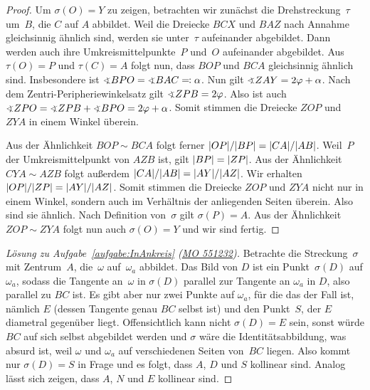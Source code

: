 \begin{proof}
	Um $\sigma(O)=Y$ zu zeigen, betrachten wir zunächst die Drehstreckung~$\tau$ um~$B$, die $C$ auf $A$ abbildet. Weil die Dreiecke $BCX$ und $BAZ$ nach Annahme gleichsinnig ähnlich sind, werden sie unter~$\tau$ aufeinander abgebildet. Dann werden auch ihre Umkreismittelpunkte~$P$ und~$O$ aufeinander abgebildet. Aus $\tau(O)=P$ und $\tau(C)=A$ folgt nun, dass $BOP$ und $BCA$ gleichsinnig ähnlich sind. Insbesondere ist $\winkel BPO=\winkel BAC\eqqcolon\alpha$. Nun gilt $\winkel ZAY=2\varphi+\alpha$. Nach dem Zentri-Peripheriewinkelsatz gilt $\winkel ZPB=2\varphi$. Also ist auch $\winkel ZPO=\winkel ZPB+\winkel BPO=2\varphi+\alpha$. Somit stimmen die Dreiecke $ZOP$ und $ZYA$ in einem Winkel überein.
	
	Aus der Ähnlichkeit $BOP\sim BCA$ folgt ferner $\abs*{OP}/\abs*{BP}=\abs*{CA}/\abs*{AB}$. Weil~$P$ der Umkreismittelpunkt von $AZB$ ist, gilt $\abs*{BP}=\abs*{ZP}$. Aus der Ähnlichkeit $CYA\sim AZB$ folgt außerdem $\abs*{CA}/\abs{AB}=\abs*{AY}/\abs*{AZ}$. Wir erhalten $\abs{OP}/\abs{ZP}=\abs{AY}/\abs{AZ}$. Somit stimmen die Dreiecke $ZOP$ und $ZYA$ nicht nur in einem Winkel, sondern auch im Verhältnis der anliegenden Seiten überein. Also sind sie ähnlich. Nach Definition von~$\sigma$ gilt $\sigma(P)=A$. Aus der Ähnlichkeit $ZOP\sim ZYA$ folgt nun auch $\sigma(O)=Y$ und wir sind fertig.
\end{proof}
\begin{proof}[Lösung zu Aufgabe~\ref{aufgabe:InAnkreis} \textmd{(\href{https://www.mathematik-olympiaden.de/moev/index.php?option=com_download&thema=a&datei=A55123a.pdf&format=raw}{MO 551232})}]
	Betrachte die Streckung~$\sigma$ mit Zentrum~$A$, die~$\omega$ auf~$\omega_a$ abbildet. Das Bild von $D$ ist ein Punkt~$\sigma(D)$ auf $\omega_a$, sodass die Tangente an~$\omega$ in $\sigma(D)$ parallel zur Tangente an $\omega_a$ in $D$, also parallel zu $BC$ ist. Es gibt aber nur zwei Punkte auf $\omega_a$, für die das der Fall ist, nämlich $E$ (dessen Tangente genau $BC$ selbst ist) und den Punkt~$S$, der $E$ diametral gegenüber liegt. Offensichtlich kann nicht $\sigma(D)=E$ sein, sonst würde $BC$ auf sich selbst abgebildet werden und $\sigma$ wäre die Identitätsabbildung, was absurd ist, weil $\omega$ und $\omega_a$ auf verschiedenen Seiten von~$BC$ liegen. Also kommt nur $\sigma(D)=S$ in Frage und es folgt, dass $A$, $D$ und $S$ kollinear sind. Analog lässt sich zeigen, dass $A$, $N$ und $E$ kollinear sind.
\end{proof}

